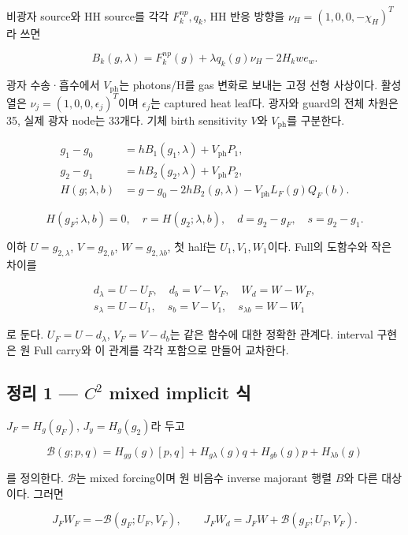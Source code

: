 비광자 source와 HH source를 각각 \(F_k^{np},q_k\), HH 반응 방향을
\(\nu_H=(1,0,0,-\chi_H)^T\)라 쓰면

\[
B_k(g,\lambda)=F_k^{np}(g)+\lambda q_k(g)\nu_H-2H_kw e_w.
\tag{18.3}
\]

광자 수송·흡수에서 \(V_{\mathrm{ph}}\)는 photons/H를 gas 변화로 보내는
고정 선형 사상이다. 활성 열은 \(\nu_j=(1,0,0,\epsilon_j)^T\)이며
\(\epsilon_j\)는 captured heat leaf다. 광자와 guard의 전체 차원은 35,
실제 광자 node는 33개다. 기체 birth sensitivity \(V\)와
\(V_{\mathrm{ph}}\)를 구분한다.

\[
\begin{aligned}
g_1-g_0&=hB_1(g_1,\lambda)+V_{\mathrm{ph}}P_1,\\
g_2-g_1&=hB_2(g_2,\lambda)+V_{\mathrm{ph}}P_2,\\
H(g;\lambda,b)&=g-g_0-2hB_2(g,\lambda)
-V_{\mathrm{ph}}L_F(g)Q_F(b).
\end{aligned}
\tag{18.4}
\]

\[
H(g_F;\lambda,b)=0,\quad r=H(g_2;\lambda,b),\quad
d=g_2-g_F,\quad s=g_2-g_1.
\tag{18.5}
\]

이하 \(U=g_{2,\lambda}\), \(V=g_{2,b}\), \(W=g_{2,\lambda b}\), 첫
half는 \(U_1,V_1,W_1\)이다. Full의 도함수와 작은 차이를

\[
\begin{gathered}
d_\lambda=U-U_F,\quad d_b=V-V_F,\quad W_d=W-W_F,\\
s_\lambda=U-U_1,\quad s_b=V-V_1,\quad s_{\lambda b}=W-W_1
\end{gathered}
\tag{18.6}
\]

로 둔다. \(U_F=U-d_\lambda\), \(V_F=V-d_b\)는 같은 함수에 대한 정확한
관계다. interval 구현은 원 Full carry와 이 관계를 각각 포함으로 만들어
교차한다.

\hypertarget{uxc815uxb9ac-1-c2-mixed-implicit-uxc2dd}{%
\subsection{\texorpdfstring{정리 1 --- \(C^2\) mixed implicit
식}{정리 1 --- C\^{}2 mixed implicit 식}}\label{uxc815uxb9ac-1-c2-mixed-implicit-uxc2dd}}

\(J_F=H_g(g_F)\), \(J_y=H_g(g_2)\)라 두고

\[
\mathcal B(g;p,q)
=H_{gg}(g)[p,q]+H_{g\lambda}(g)q
+H_{gb}(g)p+H_{\lambda b}(g)
\tag{18.7}
\]

를 정의한다. \(\mathcal B\)는 mixed forcing이며 원 비음수 inverse
majorant 행렬 \(B\)와 다른 대상이다. 그러면

\[
\boxed{
J_FW_F=-\mathcal B(g_F;U_F,V_F),\qquad
J_FW_d=J_FW+\mathcal B(g_F;U_F,V_F).
}
\tag{18.8}
\]

